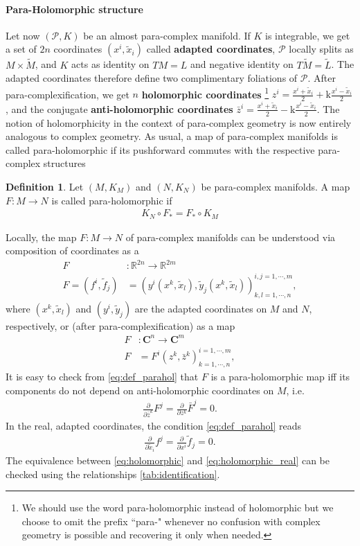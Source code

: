 \documentclass{article}
\newcommand{\Cc}{\mathbf{C}}
\newcommand{\RR}{\mathbb{R}}
\newcommand{\PS}{\mathcal{P}}
\newcommand{\p}{\partial}
\newcommand{\xt}{{\tilde{x}}}
\newcommand{\yt}{\tl{y}}
\newcommand{\kk}{\mathrm{k}}
\def\tl{\tilde}
\theoremstyle{definition}
\newtheorem{Def}[theorem]{Definition}
\theoremstyle{definition}
\theoremstyle{remark}
\begin{document}
\paragraph{Para-Holomorphic structure}
Let now $(\mathcal{P},K)$ be an almost para-complex manifold. If $K$ is integrable, we get a set of $2n$ coordinates $(x^i,\tilde{x}_i)$ called {\bf adapted coordinates}, $\mathcal{P}$ locally splits as $M\times \tilde{M}$, and $K$ acts as identity on $TM=L$ and negative identity on $T\tilde{M}=\tilde{L}$. The adapted coordinates therefore define two complimentary foliations of $\PS$. After para-complexification, we get $n$ {\bf holomorphic coordinates} \footnote{We should use the word para-holomorphic instead of holomorphic but we choose to omit the prefix ``para-" whenever no confusion with complex geometry is possible and recovering it only when needed.} $z^i=\frac{x^i+\xt_i}{2}+\kk \frac{x^i-\xt_i}{2}$, and the conjugate {\bf anti-holomorphic coordinates} $\bar{z}^i=\frac{x^i+\xt_i}{2}-\kk \frac{x^i-\xt_i}{2}$. The notion of holomorphicity in the context of para-complex geometry is now entirely analogous to complex geometry. As usual, a map of para-complex manifolds is called para-holomorphic if its pushforward commutes with the respective para-complex structures
\begin{Def}
Let $(M,K_M)$ and $(N,K_N)$ be para-complex manifolds. A map $F:M\rightarrow N$ is called para-holomorphic if
\begin{align}\label{eq:def_parahol}
K_N\circ F_*=F_*\circ K_M
\end{align}
\end{Def}

Locally, the map $F:M\rightarrow N$ of para-complex manifolds can be understood via composition of coordinates as a
\begin{align*}
F&: \RR^{2n}\rightarrow \RR^{2m}\\
F=(f^i,\tl{f}_j)&=(y^i(x^k,\xt_l),\yt_j(x^k,\xt_l))^{i,j=1,\cdots,m}_{k,l=1,\cdots, n}, 
\end{align*}
where $(x^k,\xt_l)$ and $(y^i,\yt_j)$ are the adapted coordinates on $M$ and $N$, respectively, or (after para-complexification) as a map
\begin{align*}
F&: \Cc^n\rightarrow \Cc^m\\
F&=F^i(z^k,\bar{z}^k)^{i=1,\cdots,m}_{k=1,\cdots, n}, 
\end{align*}
It is easy to check from \eqref{eq:def_parahol} that $F$ is a para-holomorphic map iff its components do not depend on anti-holomorphic coordinates on $M$, i.e.
\begin{align}\label{eq:holomorphic}
\frac{\p}{\p \bar{z}^k} F^j=\frac{\p}{\p z^k} \bar{F}^j=0.
\end{align}
In the real, adapted coordinates, the condition \eqref{eq:def_parahol} reads
\begin{align}\label{eq:holomorphic_real}
\frac{\p}{\p \xt_i}f^j=\frac{\p}{\p x^i}\tl{f}_j=0.
\end{align}
The equivalence between \eqref{eq:holomorphic} and \eqref{eq:holomorphic_real} can be checked using the relationships \eqref{tab:identification}.
\end{document}
